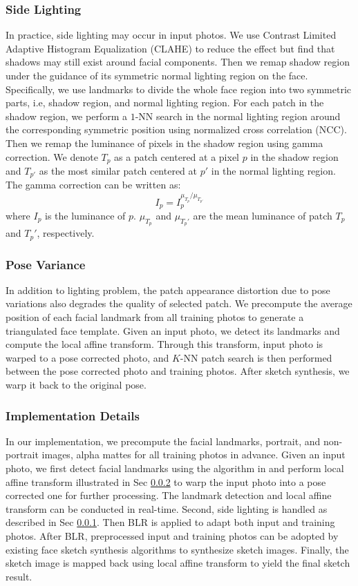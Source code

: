 \documentclass{article}
\begin{document}
\subsubsection{Side Lighting}\label{sec:sidelight}
In practice, side lighting may occur in input photos. We use Contrast Limited Adaptive Histogram Equalization (CLAHE) \cite{pizer-1987-clahe} to reduce the effect but find that shadows may still exist around facial components. Then we remap shadow region under the guidance of its symmetric normal lighting region on the face. Specifically, we use landmarks to divide the whole face region into two symmetric parts, i.e, shadow region, and normal lighting region. For each patch in the shadow region, we perform a $1$-NN search in the normal lighting region around the corresponding symmetric position using normalized cross correlation (NCC). Then we remap the luminance of pixels in the shadow region using gamma correction. We denote $T_p$ as a patch centered at a pixel $p$ in the shadow region and $T_{p'}$ as the most similar patch centered at $p'$ in the normal lighting region. The gamma correction can be written as:
\begin{equation}
I_p=I_p^{\mu_{T_p}/\mu_{T_{p'}}}
\end{equation}
where $I_p$ is the luminance of $p$. $\mu_{T_p}$ and $\mu_{T_p'}$ are the mean luminance of patch $T_p$ and $T_p'$, respectively.


\subsubsection{Pose Variance}\label{sec:pose}
In addition to lighting problem, the patch appearance distortion due to pose variations also degrades the quality of selected patch. We precompute the average position of each facial landmark from all training photos to generate a triangulated face template. Given an input photo, we detect its landmarks and compute the local affine transform. Through this transform, input photo is warped to a pose corrected photo, and $K$-NN patch search is then performed between the pose corrected photo and training photos. After sketch synthesis, we warp it back to the original pose.


\subsubsection{Implementation Details}
In our implementation, we precompute the facial landmarks, portrait, and non-portrait images, alpha mattes for all training photos in advance. Given an input photo, we first detect facial landmarks using the algorithm in \cite{Vahid-cvpr14-landmark} and perform local affine transform illustrated in Sec \ref{sec:pose} to warp the input photo into a pose corrected one for further processing. The landmark detection and local affine transform can be conducted in real-time. Second, side lighting is handled as described in Sec \ref{sec:sidelight}. Then  BLR is applied to adapt both input and training photos. After BLR, preprocessed input and training photos can be adopted by existing face sketch synthesis algorithms to synthesize sketch images. Finally, the sketch image is mapped back using local affine transform to yield the final sketch result.
\end{document}
